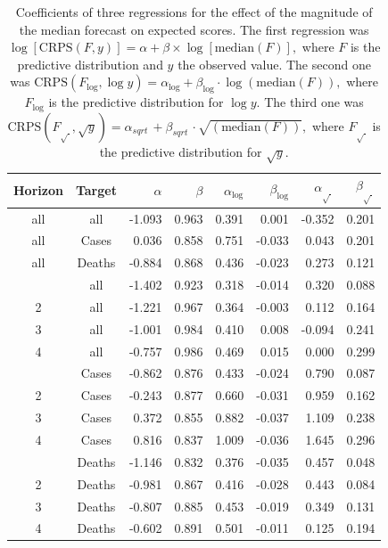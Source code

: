 \documentclass{article}
\begin{document}
\begin{table}
\centering
\begin{tabular}{ccrrrrrr}
\toprule
Horizon & Target & $\alpha$ & $\beta$ & $\alpha_{\log}$ & $\beta_{\log}$ & $\alpha_{\sqrt{\ }}$ & $\beta_{\sqrt{\ }}$\\
\midrule
all & all & -1.093 & 0.963 & 0.391 & 0.001 & -0.352 & 0.201\\
\addlinespace
all & Cases & 0.036 & 0.858 & 0.751 & -0.033 & 0.043 & 0.201\\
all & Deaths & -0.884 & 0.868 & 0.436 & -0.023 & 0.273 & 0.121\\
\addlinespace
1 & all & -1.402 & 0.923 & 0.318 & -0.014 & 0.320 & 0.088\\
2 & all & -1.221 & 0.967 & 0.364 & -0.003 & 0.112 & 0.164\\
3 & all & -1.001 & 0.984 & 0.410 & 0.008 & -0.094 & 0.241\\
4 & all & -0.757 & 0.986 & 0.469 & 0.015 & 0.000 & 0.299\\
\addlinespace
1 & Cases & -0.862 & 0.876 & 0.433 & -0.024 & 0.790 & 0.087\\
2 & Cases & -0.243 & 0.877 & 0.660 & -0.031 & 0.959 & 0.162\\
3 & Cases & 0.372 & 0.855 & 0.882 & -0.037 & 1.109 & 0.238\\
4 & Cases & 0.816 & 0.837 & 1.009 & -0.036 & 1.645 & 0.296\\
\addlinespace
1 & Deaths & -1.146 & 0.832 & 0.376 & -0.035 & 0.457 & 0.048\\
2 & Deaths & -0.981 & 0.867 & 0.416 & -0.028 & 0.443 & 0.084\\
3 & Deaths & -0.807 & 0.885 & 0.453 & -0.019 & 0.349 & 0.131\\
4 & Deaths & -0.602 & 0.891 & 0.501 & -0.011 & 0.125 & 0.194\\
\bottomrule
\end{tabular}
\caption{Coefficients of three regressions for the effect of the magnitude of the median forecast on expected scores. The first regression was 
$\log[\text{CRPS}(F, y)] = \alpha + \beta \times \log[\text{median}(F)], $ where $F$ is the predictive distribution and $y$ the observed value. The second one was 
$\text{CRPS}(F_{\log}, \log y) = \alpha_{\log} + \beta_{\log} \cdot \log{(\text{median}(F))},$ where $F_{\log}$ is the predictive distribution for $\log y$. The third one was $\text{CRPS}(F_{\sqrt{\ }}, \sqrt{y}) = \alpha_{sqrt{\ }} + \beta_{sqrt{\ }} \cdot \sqrt{(\text{median}(F))},$ where $F_{\sqrt{\ }}$ is the predictive distribution for $\sqrt{y}$.
}
\label{tab:HUB-regression}
\end{table}
\end{document}
